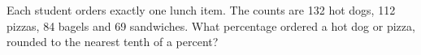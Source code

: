 Each student orders exactly one lunch item. The counts are 132 hot dogs, 112 pizzas, 84 bagels and 69 sandwiches. What percentage ordered a hot dog or pizza, rounded to the nearest tenth of a percent?
